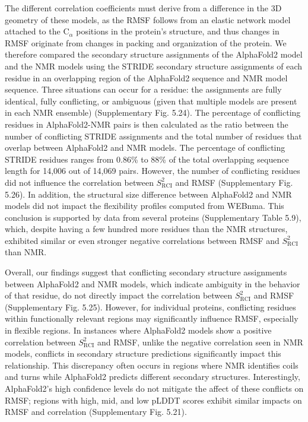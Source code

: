 The different correlation coefficients must derive from a difference in the 3D geometry of these models, as the RMSF follows from an elastic network model attached to the C$_\alpha$ positions in the protein's structure, and thus changes in RMSF originate from changes in packing and organization of the protein. We therefore compared the secondary structure assignments of the AlphaFold2 model and the NMR models using the STRIDE secondary structure assignments of each residue in an overlapping region of the AlphaFold2 sequence and NMR model sequence. Three situations can occur for a residue: the assignments are fully identical, fully conflicting, or ambiguous (given that multiple models are present in each NMR ensemble) (Supplementary Fig. 5.24).
The percentage of conflicting residues in AlphaFold2-NMR pairs is then calculated as the ratio between the number of conflicting STRIDE assignments and the total number of residues that overlap between AlphaFold2 and NMR models. The percentage of conflicting STRIDE residues ranges from $0.86$\% to $88$\% of the total overlapping sequence length for 14,006 out of 14,069 pairs. However, the number of conflicting residues did not influence the correlation between \(S^{2}_{\text{RCI}}\) and RMSF (Supplementary Fig. 5.26).
In addition, the structural size difference between AlphaFold2 and NMR models did not impact the flexibility profiles computed from WEBnma. This conclusion is supported by data from several proteins (Supplementary Table 5.9),
which, despite having a few hundred more residues than the NMR structures, exhibited similar or even stronger negative correlations between RMSF and \(S^{2}_{\text{RCI}}\) than NMR. 

Overall, our findings suggest that conflicting secondary structure assignments between AlphaFold2 and NMR models, which indicate ambiguity in the behavior of that residue, do not directly impact the correlation between \(S^{2}_{\text{RCI}}\) and RMSF (Supplementary Fig. 5.25).
However, for individual proteins, conflicting residues within functionally relevant regions may significantly influence RMSF, especially in flexible regions. In instances where AlphaFold2 models show a positive correlation between \(S^{2}_{\text{RCI}}\) and RMSF, unlike the negative correlation seen in NMR models, conflicts in secondary structure predictions significantly impact this relationship. This discrepancy often occurs in regions where NMR identifies coils and turns while AlphaFold2 predicts different secondary structures. Interestingly, AlphaFold2's high confidence levels do not mitigate the affect of these conflicts on RMSF; regions with high, mid, and low pLDDT scores exhibit similar impacts on RMSF and correlation (Supplementary Fig. 5.21).

